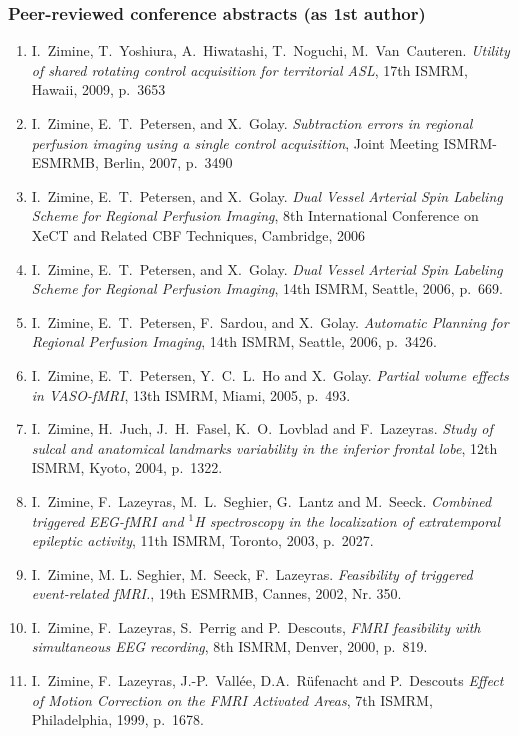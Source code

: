 \documentclass[a4paper,11pt,oneside]{article}
\begin{document}
\subsubsection*{Peer-reviewed conference abstracts (as 1st author)} 
\begin{enumerate}

\item I.~Zimine, T.~Yoshiura, A.~Hiwatashi, T.~Noguchi, M.~Van~Cauteren.
\textit{Utility of shared rotating control acquisition for territorial
ASL}, 17th ISMRM, Hawaii, 2009, p.~3653

\item I.~Zimine, E.~T.~Petersen, and X.~Golay.
\textit{Subtraction errors in regional perfusion imaging using a single
control acquisition}, Joint Meeting ISMRM-ESMRMB, Berlin, 2007, p.~3490

\item I.~Zimine, E.~T.~Petersen, and X.~Golay.
\textit{Dual Vessel Arterial Spin Labeling Scheme for Regional Perfusion
Imaging}, 8th International Conference on XeCT and Related CBF Techniques,
Cambridge, 2006

\item I.~Zimine, E.~T.~Petersen, and X.~Golay.
\textit{Dual Vessel Arterial Spin Labeling Scheme for Regional Perfusion
Imaging}, 14th ISMRM, Seattle, 2006, p.~669.

\item I.~Zimine, E.~T.~Petersen, F.~Sardou, and X.~Golay.
\textit{Automatic Planning for Regional Perfusion Imaging}, 
14th ISMRM, Seattle, 2006, p.~3426.

\item I.~Zimine, E.~T.~Petersen, Y.~C.~L.~Ho and X.~Golay.
\textit{Partial volume effects in VASO-fMRI}, 13th ISMRM, Miami,
2005, p.~493.

\item I.~Zimine, H.~Juch, J.~H.~Fasel, K.~O.~Lovblad and F.~Lazeyras.
\textit{Study of sulcal and anatomical landmarks variability in the
inferior frontal lobe}, 12th ISMRM, Kyoto, 2004, p.~1322.

\item I.~Zimine, F.~Lazeyras, M.~L.~Seghier, G.~Lantz and M.~Seeck.
\textit{Combined triggered EEG-fMRI and $^1$H spectroscopy in the
localization of extratemporal epileptic activity}, 11th ISMRM,
Toronto, 2003, p.~2027.

\item I.~Zimine, M. L. Seghier, M.~Seeck, F.~Lazeyras.
\textit{Feasibility of triggered event-related fMRI.}, 19th ESMRMB,
Cannes, 2002, Nr. 350.

\item I.~Zimine, F.~Lazeyras, S.~Perrig and P.~Descouts,
\textit{FMRI feasibility with simultaneous EEG recording}, 
8th ISMRM, Denver, 2000, p.~819.

\item I.~Zimine, F.~Lazeyras, J.-P.~Vall\'{e}e, D.A.~R\"{u}fenacht
and P.~Descouts \textit{Effect of Motion Correction on the FMRI Activated
Areas}, 7th ISMRM, Philadelphia, 1999, p.~1678.

\end{enumerate}
\end{document}
